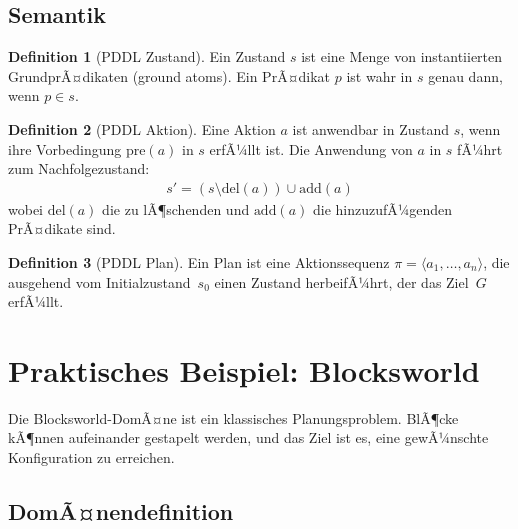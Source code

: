 ﻿\documentclass[a4paper,12pt]{article}
\theoremstyle{definition}
\newtheorem{definition}{Definition}[section]
\begin{document}
\subsection{Semantik}

\begin{definition}[PDDL Zustand]
	Ein Zustand $s$ ist eine Menge von instantiierten GrundprÃ¤dikaten (ground atoms). Ein PrÃ¤dikat $p$ ist wahr in $s$ genau dann, wenn $p \in s$.
\end{definition}

\begin{definition}[PDDL Aktion]
	Eine Aktion $a$ ist anwendbar in Zustand $s$, wenn ihre Vorbedingung $\text{pre}(a)$ in $s$ erfÃ¼llt ist. Die Anwendung von $a$ in $s$ fÃ¼hrt zum Nachfolgezustand:
	\begin{align}
	s' = (s \setminus \text{del}(a)) \cup \text{add}(a)
	\end{align}
	wobei $\text{del}(a)$ die zu lÃ¶schenden und $\text{add}(a)$ die hinzuzufÃ¼genden PrÃ¤dikate sind.
\end{definition}

\begin{definition}[PDDL Plan]
	Ein Plan ist eine Aktionssequenz $\pi = \langle a_1, \ldots, a_n \rangle$, die ausgehend
	vom Initialzustand~$s_0$ einen Zustand herbeifÃ¼hrt, der das Ziel~$G$ erfÃ¼llt.
\end{definition}

\section{Praktisches Beispiel: Blocksworld}

Die Blocksworld-DomÃ¤ne ist ein klassisches Planungsproblem. BlÃ¶cke kÃ¶nnen aufeinander gestapelt werden, und das Ziel ist es, eine gewÃ¼nschte Konfiguration zu erreichen.

\subsection{DomÃ¤nendefinition}
\end{document}
